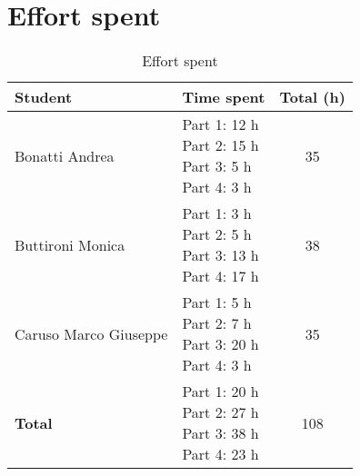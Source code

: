 \chapter{Effort spent}
		\begin{table}[!h]
			\centering
			\begin{tabular}{llc}
				\toprule
					\textbf{Student} & \textbf{Time spent} & \textbf{Total (h)} \\
				\midrule
					Bonatti Andrea & \makecell[l]{ Part 1: 12 h\\ Part 2: 15 h \\ Part 3: 5 h \\ Part 4: 3 h} & 35 \\
					\hline
					Buttironi Monica & \makecell[l]{ Part 1: 3 h \\ Part 2: 5 h \\ Part 3: 13 h \\ Part 4: 17 h} & 38 \\	
					\hline
					Caruso Marco Giuseppe & \makecell[l]{ Part 1: 5 h \\ Part 2: 7 h \\ Part 3: 20 h \\ Part 4: 3 h} & 35 \\
					\hline
					\hline
					\textbf{Total} & \makecell[l]{ Part 1: 20 h\\ Part 2: 27 h \\ Part 3: 38 h \\ Part 4: 23 h} & 108 \\
			\bottomrule	
			\end{tabular}
			\caption{Effort spent}
		\end{table}
	